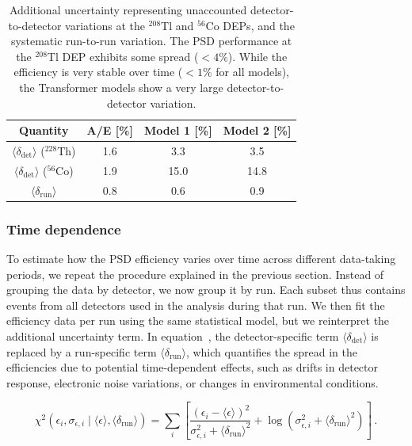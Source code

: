 \begin{table}
\centering
\caption{Additional uncertainty representing unaccounted detector-to-detector variations at the $^{208}$Tl and $^{56}$Co DEPs, and the systematic run-to-run variation. The PSD performance at the $^{208}$Tl DEP exhibits some spread ($< 4\%$). While the efficiency is very stable over time ($< 1\%$ for all models), the Transformer models show a very large detector-to-detector variation.}
\begin{tabular}{||c | c | c | c ||}
	\hline
 	\textbf{Quantity}  & \textbf{A/E [\%]} & \textbf{Model 1 [\%]} & \textbf{Model 2 [\%]} \\
 	\hline
    $\langle \delta_{\mathrm{det}} \rangle$ ($^{228}$Th) & 1.6 & 3.3 & 3.5  \\
 	\hline
 	$\langle \delta_{\mathrm{det}} \rangle$ ($^{56}$Co) & 1.9 & 15.0 & 14.8 \\
    \hline
 	$\langle \delta_{\mathrm{run}} \rangle$ & 0.8 & 0.6 & 0.9 \\ 
    \hline
\end{tabular}
\label{tab:fit_variances}
\end{table}

\subsubsection{Time dependence}

To estimate how the PSD efficiency varies over time across different data-taking periods, we repeat the procedure explained in the previous section. Instead of grouping the data by detector, we now group it by run. Each subset thus contains events from all detectors used in the analysis during that run. 
We then fit the efficiency data per run using the same statistical model, but we reinterpret the additional uncertainty term. In equation~, the detector-specific term $\langle \delta_{\mathrm{det}} \rangle$ is replaced by a run-specific term $\langle \delta_{\mathrm{run}} \rangle$, which quantifies the spread in the efficiencies due to potential time-dependent effects, such as drifts in detector response, electronic noise variations, or changes in environmental conditions.

\begin{equation}
\label{eq:chi2_eff_fit_time}
	\chi^2(\epsilon_i, \sigma_{\epsilon, i} \mid \langle \epsilon \rangle, \langle \delta_{\text{run}} \rangle) =
	\sum_i \left[ \frac{(\epsilon_i - \langle \epsilon \rangle)^2}{\sigma_{\epsilon,i}^2 + \langle \delta_{\text{run}} \rangle^2} + \log(\sigma_{\epsilon,i}^2 + \langle \delta_{\text{run}} \rangle^2) \right] \,.
\end{equation}

